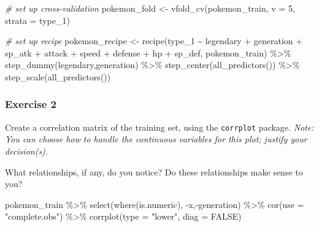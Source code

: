 \documentclass[
]{article}
\newenvironment{Shaded}{\begin{snugshade}}{\end{snugshade}}
\newcommand{\AttributeTok}[1]{\textcolor[rgb]{0.77,0.63,0.00}{#1}}
\newcommand{\CommentTok}[1]{\textcolor[rgb]{0.56,0.35,0.01}{\textit{#1}}}
\newcommand{\ConstantTok}[1]{\textcolor[rgb]{0.00,0.00,0.00}{#1}}
\newcommand{\DecValTok}[1]{\textcolor[rgb]{0.00,0.00,0.81}{#1}}
\newcommand{\FunctionTok}[1]{\textcolor[rgb]{0.00,0.00,0.00}{#1}}
\newcommand{\NormalTok}[1]{#1}
\newcommand{\OtherTok}[1]{\textcolor[rgb]{0.56,0.35,0.01}{#1}}
\newcommand{\SpecialCharTok}[1]{\textcolor[rgb]{0.00,0.00,0.00}{#1}}
\newcommand{\StringTok}[1]{\textcolor[rgb]{0.31,0.60,0.02}{#1}}
\begin{document}
\begin{Shaded}
\begin{Highlighting}[]
\CommentTok{\# set up cross{-}validation}
\NormalTok{pokemon\_fold }\OtherTok{\textless{}{-}} \FunctionTok{vfold\_cv}\NormalTok{(pokemon\_train, }\AttributeTok{v =} \DecValTok{5}\NormalTok{, }\AttributeTok{strata =}\NormalTok{ type\_1)}

\CommentTok{\# set up recipe}
\NormalTok{pokemon\_recipe }\OtherTok{\textless{}{-}} \FunctionTok{recipe}\NormalTok{(type\_1 }\SpecialCharTok{\textasciitilde{}}\NormalTok{ legendary }\SpecialCharTok{+}\NormalTok{ generation }\SpecialCharTok{+}\NormalTok{ sp\_atk }\SpecialCharTok{+} 
\NormalTok{                         attack }\SpecialCharTok{+}\NormalTok{ speed }\SpecialCharTok{+}\NormalTok{ defense }\SpecialCharTok{+}\NormalTok{ hp }\SpecialCharTok{+}\NormalTok{ sp\_def, pokemon\_train) }\SpecialCharTok{\%\textgreater{}\%} 
  \FunctionTok{step\_dummy}\NormalTok{(legendary,generation) }\SpecialCharTok{\%\textgreater{}\%} 
  \FunctionTok{step\_center}\NormalTok{(}\FunctionTok{all\_predictors}\NormalTok{()) }\SpecialCharTok{\%\textgreater{}\%}
  \FunctionTok{step\_scale}\NormalTok{(}\FunctionTok{all\_predictors}\NormalTok{())}
\end{Highlighting}
\end{Shaded}

\hypertarget{exercise-2}{%
\subsubsection{Exercise 2}\label{exercise-2}}

Create a correlation matrix of the training set, using the
\texttt{corrplot} package. \emph{Note: You can choose how to handle the
continuous variables for this plot; justify your decision(s).}

What relationships, if any, do you notice? Do these relationships make
sense to you?

\begin{Shaded}
\begin{Highlighting}[]
\NormalTok{pokemon\_train }\SpecialCharTok{\%\textgreater{}\%} 
  \FunctionTok{select}\NormalTok{(}\FunctionTok{where}\NormalTok{(is.numeric), }\SpecialCharTok{{-}}\NormalTok{x,}\SpecialCharTok{{-}}\NormalTok{generation) }\SpecialCharTok{\%\textgreater{}\%} 
  \FunctionTok{cor}\NormalTok{(}\AttributeTok{use =} \StringTok{"complete.obs"}\NormalTok{) }\SpecialCharTok{\%\textgreater{}\%} 
  \FunctionTok{corrplot}\NormalTok{(}\AttributeTok{type =} \StringTok{"lower"}\NormalTok{, }\AttributeTok{diag =} \ConstantTok{FALSE}\NormalTok{)  }
\end{Highlighting}
\end{Shaded}
\end{document}

